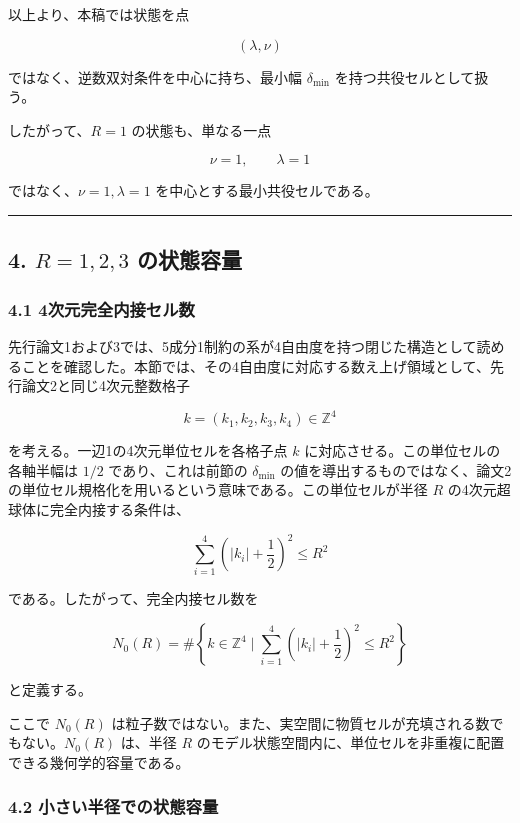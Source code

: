 \documentclass[
]{ltjsarticle}
\begin{document}
以上より、本稿では状態を点

\[
(\lambda,\nu)
\]

ではなく、逆数双対条件を中心に持ち、最小幅 \(\delta_{\min}\)
を持つ共役セルとして扱う。

したがって、\(R=1\) の状態も、単なる一点

\[
\nu=1,\qquad \lambda=1
\]

ではなく、\(\nu=1,\lambda=1\) を中心とする最小共役セルである。

\begin{center}\rule{0.5\linewidth}{0.5pt}\end{center}

\subsection{\texorpdfstring{4. \(R=1,2,3\)
の状態容量}{4. R=1,2,3 の状態容量}}\label{r123-ux306eux72b6ux614bux5bb9ux91cf}

\subsubsection{4.1
4次元完全内接セル数}\label{ux6b21ux5143ux5b8cux5168ux5185ux63a5ux30bbux30ebux6570}

先行論文1および3では、5成分1制約の系が4自由度を持つ閉じた構造として読めることを確認した。本節では、その4自由度に対応する数え上げ領域として、先行論文2と同じ4次元整数格子

\[
k=(k_1,k_2,k_3,k_4)\in\mathbb{Z}^4
\]

を考える。一辺1の4次元単位セルを各格子点 \(k\)
に対応させる。この単位セルの各軸半幅は \(1/2\) であり、これは前節の
\(\delta_{\min}\)
の値を導出するものではなく、論文2の単位セル規格化を用いるという意味である。この単位セルが半径
\(R\) の4次元超球体に完全内接する条件は、

\[
\sum_{i=1}^{4}\left(|k_i|+\frac12\right)^2\le R^2
\]

である。したがって、完全内接セル数を

\[
N_0(R)=\#\left\{k\in\mathbb{Z}^4\mid
\sum_{i=1}^{4}\left(|k_i|+\frac12\right)^2\le R^2
\right\}
\]

と定義する。

ここで \(N_0(R)\)
は粒子数ではない。また、実空間に物質セルが充填される数でもない。\(N_0(R)\)
は、半径 \(R\)
のモデル状態空間内に、単位セルを非重複に配置できる幾何学的容量である。

\subsubsection{4.2
小さい半径での状態容量}\label{ux5c0fux3055ux3044ux534aux5f84ux3067ux306eux72b6ux614bux5bb9ux91cf}
\end{document}
